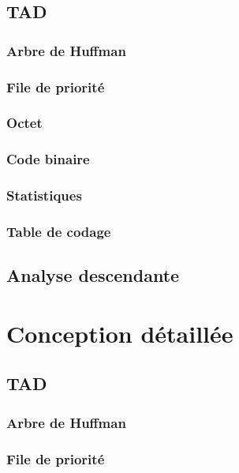 \documentclass[12pt,a4paper]{article}
\begin{document}
\subsection{TAD}
\subsubsection{Arbre de Huffman}

\subsubsection{File de priorité}

\subsubsection{Octet}

\subsubsection{Code binaire}

\subsubsection{Statistiques}

\subsubsection{Table de codage}

\subsection{Analyse descendante}


\section{Conception détaillée}
\subsection{TAD}
\subsubsection{Arbre de Huffman}
%
\subsubsection{File de priorité}

\end{document}
